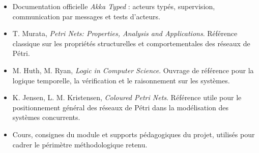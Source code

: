 \documentclass[11pt,a4paper]{article}
\begin{document}
\begin{itemize}
    \item Documentation officielle \emph{Akka Typed} : acteurs typés, supervision, communication par messages et tests d'acteurs.
    \item T. Murata, \emph{Petri Nets: Properties, Analysis and Applications}. Référence classique sur les propriétés structurelles et comportementales des réseaux de Pétri.
    \item M. Huth, M. Ryan, \emph{Logic in Computer Science}. Ouvrage de référence pour la logique temporelle, la vérification et le raisonnement sur les systèmes.
    \item K. Jensen, L. M. Kristensen, \emph{Coloured Petri Nets}. Référence utile pour le positionnement général des réseaux de Pétri dans la modélisation des systèmes concurrents.
    \item Cours, consignes du module et supports pédagogiques du projet, utilisés pour cadrer le périmètre méthodologique retenu.
\end{itemize}
\end{document}
